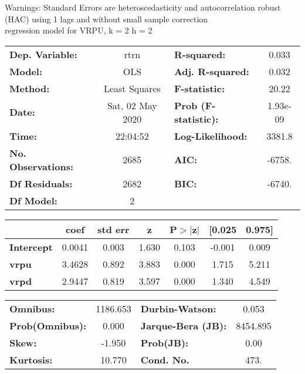 Warnings: \newline
 [1] Standard Errors are heteroscedasticity and autocorrelation robust (HAC) using 1 lags and without small sample correction\\ 

regression model for VRPU, k = 2 h = 2\begin{center}
\begin{tabular}{lclc}
\toprule
\textbf{Dep. Variable:}    &       rtrn       & \textbf{  R-squared:         } &     0.033   \\
\textbf{Model:}            &       OLS        & \textbf{  Adj. R-squared:    } &     0.032   \\
\textbf{Method:}           &  Least Squares   & \textbf{  F-statistic:       } &     20.22   \\
\textbf{Date:}             & Sat, 02 May 2020 & \textbf{  Prob (F-statistic):} &  1.93e-09   \\
\textbf{Time:}             &     22:04:52     & \textbf{  Log-Likelihood:    } &    3381.8   \\
\textbf{No. Observations:} &        2685      & \textbf{  AIC:               } &    -6758.   \\
\textbf{Df Residuals:}     &        2682      & \textbf{  BIC:               } &    -6740.   \\
\textbf{Df Model:}         &           2      & \textbf{                     } &             \\
\bottomrule
\end{tabular}
\begin{tabular}{lcccccc}
                   & \textbf{coef} & \textbf{std err} & \textbf{z} & \textbf{P$> |$z$|$} & \textbf{[0.025} & \textbf{0.975]}  \\
\midrule
\textbf{Intercept} &       0.0041  &        0.003     &     1.630  &         0.103        &       -0.001    &        0.009     \\
\textbf{vrpu}      &       3.4628  &        0.892     &     3.883  &         0.000        &        1.715    &        5.211     \\
\textbf{vrpd}      &       2.9447  &        0.819     &     3.597  &         0.000        &        1.340    &        4.549     \\
\bottomrule
\end{tabular}
\begin{tabular}{lclc}
\textbf{Omnibus:}       & 1186.653 & \textbf{  Durbin-Watson:     } &    0.053  \\
\textbf{Prob(Omnibus):} &   0.000  & \textbf{  Jarque-Bera (JB):  } & 8454.895  \\
\textbf{Skew:}          &  -1.950  & \textbf{  Prob(JB):          } &     0.00  \\
\textbf{Kurtosis:}      &  10.770  & \textbf{  Cond. No.          } &     473.  \\
\bottomrule
\end{tabular}
\end{center}

